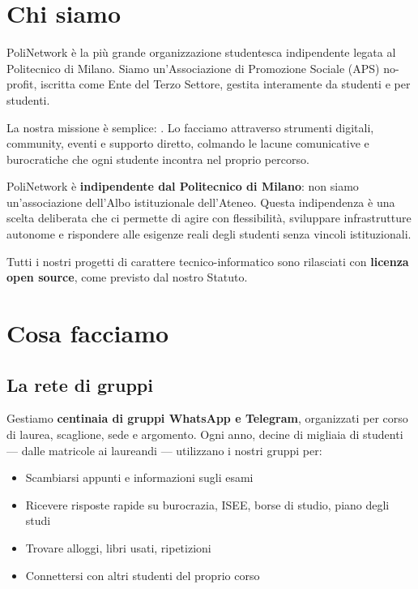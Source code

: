 \documentclass[report]{polinetwork}
\begin{document}
\pnMakeTitlePage


\section{Chi siamo}

PoliNetwork è la più grande organizzazione studentesca indipendente
legata al Politecnico di Milano. Siamo un'Associazione di Promozione
Sociale (APS) no-profit, iscritta come Ente del Terzo Settore,
gestita interamente da studenti e per studenti.

La nostra missione è semplice: . Lo facciamo attraverso
strumenti digitali, community, eventi e supporto diretto, colmando
le lacune comunicative e burocratiche che ogni studente incontra nel
proprio percorso.

PoliNetwork è \textbf{indipendente dal Politecnico di Milano}: non
siamo un'associazione dell'Albo istituzionale dell'Ateneo.
Questa indipendenza è una scelta deliberata che ci permette di agire
con flessibilità, sviluppare infrastrutture autonome e rispondere
alle esigenze reali degli studenti senza vincoli istituzionali.

Tutti i nostri progetti di carattere tecnico-informatico sono
rilasciati con \textbf{licenza open source}, come previsto dal
nostro Statuto.

\section{Cosa facciamo}

\subsection{La rete di gruppi}

Gestiamo \textbf{centinaia di gruppi WhatsApp e Telegram}, organizzati
per corso di laurea, scaglione, sede e argomento. Ogni anno, decine di
migliaia di studenti --- dalle matricole ai laureandi --- utilizzano i
nostri gruppi per:

\begin{itemize}
  \item Scambiarsi appunti e informazioni sugli esami
  \item Ricevere risposte rapide su burocrazia, ISEE, borse di studio,
    piano degli studi
  \item Trovare alloggi, libri usati, ripetizioni
  \item Connettersi con altri studenti del proprio corso
\end{itemize}
\end{document}
